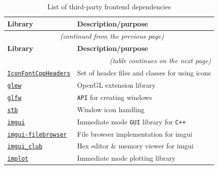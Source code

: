 \documentclass[english, ing, kiv, he, iso690numb, pdf]{fasthesis}
\begin{document}
	\begin{center}
		\begin{longtable}{p{}p{}}
			\caption{List of third-party frontend dependencies}
			\label{List of third-party frontend dependencies}\\
			\toprule[1.5pt]
			\textbf{Library} & \textbf{Description/purpose}\\
			\midrule
			\endfirsthead
			\multicolumn{2}{c}{\tablename{}~\thetable{} \textit{(continued from the previous page)}}\\
			\midrule
			\textbf{Library} & \textbf{Description/purpose}\\
			\midrule
			\endhead
			\midrule
			\multicolumn{2}{r}{\textit{(table continues on the next page)}}\\
			\endfoot
			\bottomrule[1.5pt]
			\endlastfoot
			\href{https://github.com/juliettef/IconFontCppHeaders/tree/fdeaa7dacef4507cccce0fb1df75b0f7546e15d4}{\texttt{IconFontCppHeaders}} & Set of header files and classes for using icons\\
			
			\href{https://github.com/Perlmint/glew-cmake/tree/f266584c9adb71f6e2541b8f90aa4d6c88ef8ec0}{\texttt{glew}} & OpenGL extension library \\
			
			\href{https://github.com/glfw/glfw/tree/9a87635686c7fcb63ca63149c5b179b85a53a725}{\texttt{glfw}} & \texttt{API} for creating windows \\
			
			\href{https://github.com/nothings/stb/tree/5736b15f7ea0ffb08dd38af21067c314d6a3aae9}{\texttt{stb}} & Window icon handling \\
			
			\midrule
			
			\href{https://github.com/ocornut/imgui/tree/ef07ddf087c879baff8c0cac0ff1f40b7f0f060c}{\texttt{imgui}} & Immediate mode \texttt{GUI} library for \texttt{C++} \\
			
			\href{https://github.com/AirGuanZ/imgui-filebrowser/tree/fbafb0888225de15a2abad2d8bb71ef7441697d1}{\texttt{imgui-filebrowser}} & File browser implementation for imgui \\
			
			\href{https://github.com/ocornut/imgui_club/tree/ea49dd3c6803088d50b496e3fe981501543b7cbc}{\texttt{imgui\_club}} & Hex editor \& memory viewer for imgui \\
			
			\href{https://github.com/epezent/implot/tree/cc5e1daa5c7f2335a9460ae79c829011dc5cef2d}{\texttt{implot}} & Immediate mode plotting library \\
		\end{longtable}
	\end{center}
	
\end{document}
